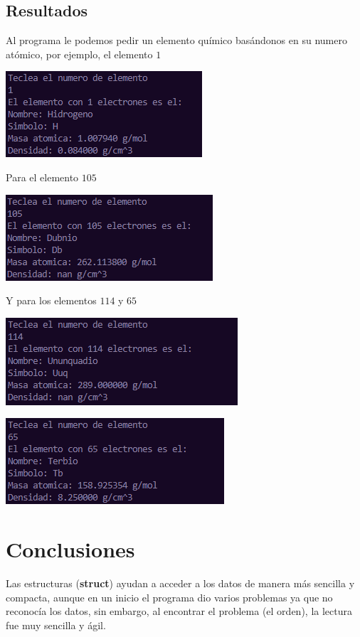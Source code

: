 \documentclass[12pt]{article}
\begin{document}
\begin{multicols}{2}
			\subsection{Resultados}
				Al programa le podemos pedir un elemento químico basándonos en su numero atómico, por ejemplo, el elemento $1$
				\begin{center}
					\includegraphics[scale=0.9]{1.png}
				\end{center}
				Para el elemento $105$
				\begin{center}
					\includegraphics[scale=0.9]{2.png}
				\end{center}
				Y para los elementos $114$ y $65$
				\begin{center}
					\includegraphics[scale=0.9]{3.png}
				\end{center}
				\begin{center}
					\includegraphics[scale=0.9]{4.png}
				\end{center}
		\section{Conclusiones}
			Las estructuras (\textbf{struct}) ayudan a acceder a los datos de manera más sencilla y compacta, aunque en un inicio el programa dio varios problemas ya que no reconocía los datos, sin embargo, al encontrar el problema (el orden), la lectura fue muy sencilla y ágil.
	\end{multicols}
	\appendix 
\end{document}
